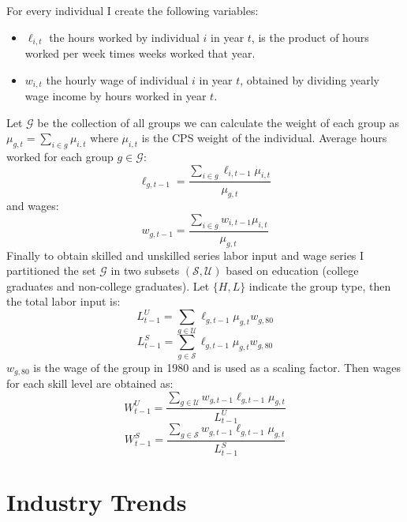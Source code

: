 \documentclass[12pt]{article}
\begin{document}
For every individual I create the following variables:
\begin{itemize}
\item $\ell_{i,t}$ the hours worked by individual $i$ in year $t$, is the product of hours worked per week times weeks worked that year.
\item $w_{i,t}$ the hourly wage of individual $i$ in year $t$, obtained by dividing yearly wage income by hours worked in year $t$.
\end{itemize}

Let $\mathcal{G}$ be the collection of all groups we can calculate the weight of each group as $\mu_{g,t} = \sum_{i\in g} \mu_{i,t}$ where $ \mu_{i,t}$ is the CPS weight of the individual. Average hours worked for each group $g\in\mathcal{G}$: 
\[
\ell_{g, t-1} = \frac{\sum_{i\in g}\ell_{i,t-1} \mu_{i,t}}{\mu_{g, t}}
\]
and wages:
\[
w_{g, t-1} = \frac{\sum_{i\in g}w_{i,t-1} \mu_{i,t}}{\mu_{g, t}}
\]
Finally to obtain skilled and unskilled series labor input and wage series I partitioned the set $\mathcal{G}$ in two subsets $(\mathcal{S}, \mathcal{U})$ based on education (college graduates and non-college graduates). Let $\{H, L\}$ indicate the group type, then the total labor input is:
\[
 L^U_{t-1} = \sum_{g \in\mathcal{U}} \ell_{g, t-1} \mu_{g,t} w_{g,80}
\]
\[
 L^S_{t-1} = \sum_{g \in\mathcal{S}} \ell_{g, t-1} \mu_{g,t} w_{g,80}
\]
$w_{g,80}$ is the wage of the group in 1980 and is used as a scaling factor. Then wages for each skill level are obtained as:
\[
W^U_{t-1} = \frac{\sum_{g \in \mathcal{U}} w_{g, t-1} \ell_{g, t-1} \mu_{g,t}}{L^U_{t-1}}
\]
\[
W^S_{t-1} = \frac{\sum_{g \in \mathcal{S}} w_{g, t-1} \ell_{g, t-1} \mu_{g,t}}{L^S_{t-1}}
\]

\section{Industry Trends}\label{sec:industry-trends}

\pagebreak


\end{document}
